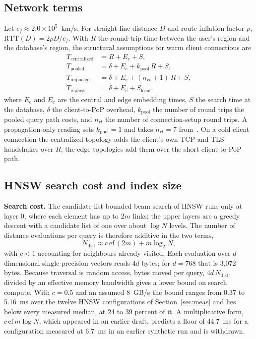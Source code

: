 \documentclass[conference]{IEEEtran}
\begin{document}
\subsection{Network terms}\label{sec:net}
Let $c_f \approx 2.0\times10^{5}$~km/s. For straight-line distance $D$ and route-inflation factor
$\rho$, $\mathrm{RTT}(D) = 2\rho D / c_f$. With $R$ the round-trip time between the user's region
and the database's region, the structural assumptions for warm client connections are
\begin{equation}
\begin{aligned}
T_{\mathrm{centralized}} &= R + E_c + S, \\
T_{\mathrm{pooled}} &= \delta + E_e + k_{\mathrm{pool}}\,R + S, \\
T_{\mathrm{unpooled}} &= \delta + E_e + (n_{rt} + 1)\,R + S, \\
T_{\mathrm{replica}} &= \delta + E_e + S_{\mathrm{local}},
\end{aligned}
\label{eq:topo}
\end{equation}
where $E_c$ and $E_e$ are the central and edge embedding times, $S$ the search time at the
database, $\delta$ the client-to-PoP overhead, $k_{\mathrm{pool}}$ the number of round trips the
pooled query path costs, and $n_{rt}$ the number of connection-setup round trips. A
propagation-only reading sets $k_{\mathrm{pool}} = 1$ and takes $n_{rt} = 7$
from~\cite{hyperdrive2023}. On a cold client connection the centralized topology adds the client's
own TCP and TLS handshakes over $R$; the edge topologies add them over the short client-to-PoP
path.

\subsection{HNSW search cost and index size}\label{sec:hnsw}
\textbf{Search cost.} The candidate-list-bounded beam search of HNSW runs only at layer 0, where
each element has up to $2m$ links; the upper layers are a greedy descent with a candidate list of
one over about $\log N$ levels. The number of distance evaluations per query is therefore additive
in the two terms,
\begin{equation}
N_{\mathrm{dist}} \approx c\,\mathrm{ef}\,(2m) + m\log_2 N,
\label{eq:ndist}
\end{equation}
with $c < 1$ accounting for neighbours already visited. Each evaluation over $d$-dimensional
single-precision vectors reads $4d$ bytes; for $d = 768$ that is 3{,}072 bytes. Because traversal
is random access, bytes moved per query, $4d\,N_{\mathrm{dist}}$, divided by an effective memory
bandwidth gives a lower bound on search compute. With $c = 0.5$ and an assumed 8~GB/s the bound
ranges from 0.37 to 5.16~ms over the twelve HNSW configurations of Section~\ref{sec:meas} and lies
below every measured median, at 24 to 39 percent of it. A multiplicative form,
$c\,\mathrm{ef}\,\bar m \log N$, which appeared in an earlier draft, predicts a floor of 44.7~ms
for a configuration measured at 6.7~ms in an earlier synthetic run and is withdrawn.
\end{document}
